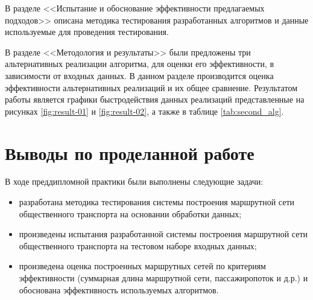 \documentclass[a4paper, 14pt]{extreport}
\begin{document}
    В разделе <<Испытание и обоснование эффективности предлагаемых подходов>> описана методика тестирования 
    разработанных алгоритмов и данные используемые для проведения тестирования.

    В разделе <<Методология и результаты>> были предложены три альтернативных реализации алгоритма, для оценки его 
    эффективности, в зависимости от входных данных. В данном разделе производится оценка эффективности альтернативных 
    реализаций и их общее сравнение. Результатом работы является графики быстродействия данных реализаций представленные 
    на рисунках \ref{fig:result-01} и \ref{fig:result-02}, а также в таблице \ref{tab:second_alg}.

    \chapter{Выводы по проделанной работе}
    В ходе преддипломной практики были выполнены следующие задачи:
    \begin{itemize}
        \item разработана методика тестирования системы построения маршрутной сети общественного транспорта на 
            основании обработки данных;
        \item произведены испытания разработанной системы построения маршрутной сети общественного транспорта на 
            тестовом наборе входных данных;
        \item произведена оценка построенных маршрутных сетей по критериям эффективности (суммарная длина маршрутной 
            сети, пассажиропоток и д.р.) и обоснована эффективность используемых алгоритмов.
    \end{itemize}
\end{document}
